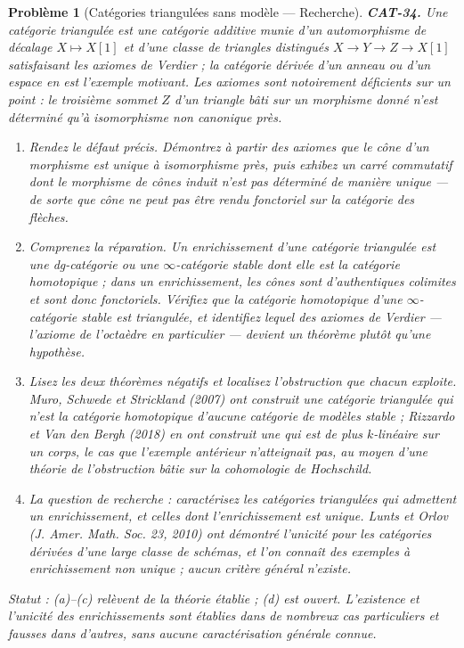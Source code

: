 \documentclass[11pt]{article}
\newtheorem{problem}{Problème}
\begin{document}
\begin{problem}[{Catégories triangulées sans modèle --- Recherche}]
\textbf{CAT-34.} Une \textit{catégorie triangulée} est une catégorie additive munie d'un
automorphisme de décalage $ X \mapsto X[1] $ et d'une classe de triangles distingués
$ X \to Y \to Z \to X[1] $ satisfaisant les axiomes de Verdier ; la catégorie dérivée d'un
anneau ou d'un espace en est l'exemple motivant. Les axiomes sont notoirement déficients sur un
point : le troisième sommet $ Z $ d'un triangle bâti sur un morphisme donné n'est déterminé qu'à
isomorphisme non canonique près.
\begin{enumerate}
\item[(a)] Rendez le défaut précis. Démontrez à partir des axiomes que le cône d'un morphisme est unique à
isomorphisme près, puis exhibez un carré commutatif dont le morphisme de cônes induit n'est pas
déterminé de manière unique --- de sorte que \og{} cône \fg{} ne peut pas être rendu fonctoriel sur la
catégorie des flèches.
\item[(b)] Comprenez la réparation. Un \textit{enrichissement} d'une catégorie triangulée est une
dg-catégorie ou une $\infty$-catégorie stable dont elle est la catégorie homotopique ; dans un
enrichissement, les cônes sont d'authentiques colimites et sont donc fonctoriels. Vérifiez que la
catégorie homotopique d'une $\infty$-catégorie stable est triangulée, et identifiez lequel des axiomes de
Verdier --- l'axiome de l'octaèdre en particulier --- devient un théorème plutôt qu'une hypothèse.
\item[(c)] Lisez les deux théorèmes négatifs et localisez l'obstruction que chacun exploite. Muro,
Schwede et Strickland (2007) ont construit une catégorie triangulée qui n'est la catégorie
homotopique d'aucune catégorie de modèles stable ; Rizzardo et Van den Bergh (2018) en ont
construit une qui est de plus $ k $-linéaire sur un corps, le cas que l'exemple antérieur
n'atteignait pas, au moyen d'une théorie de l'obstruction bâtie sur la cohomologie de Hochschild.
\item[(d)] La question de recherche : caractérisez les catégories triangulées qui admettent un
enrichissement, et celles dont l'enrichissement est unique. Lunts et Orlov (J. Amer. Math. Soc. 23,
2010) ont démontré l'unicité pour les catégories dérivées d'une large classe de schémas, et l'on
connaît des exemples à enrichissement non unique ; aucun critère général n'existe.
\end{enumerate}
\textit{Statut : (a)--(c) relèvent de la théorie établie ; (d) est ouvert. L'existence et l'unicité
des enrichissements sont établies dans de nombreux cas particuliers et fausses dans d'autres, sans
aucune caractérisation générale connue.}
\end{problem}
\end{document}
